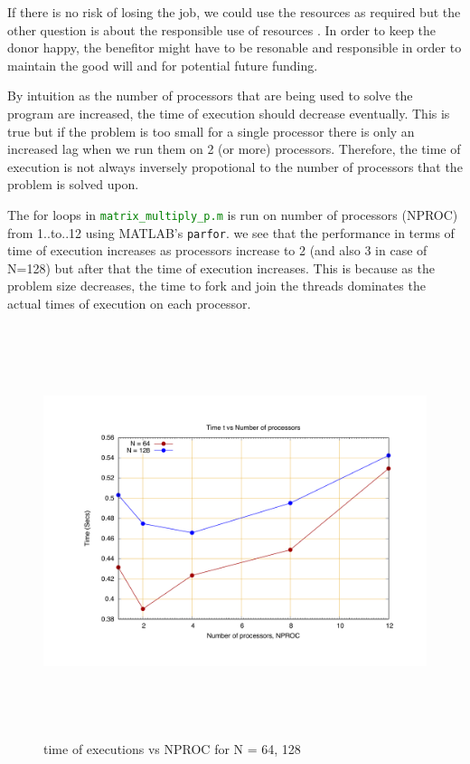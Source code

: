 \documentclass[fleqn,letterpaper,12pt]{report}
\begin{document}
If there is no risk of losing the job, we could use the resources as required but the other question is about the responsible use of resources \cite{cdresources}. In order to keep the donor happy, the benefitor might have to be resonable and responsible in order to maintain the good will and for potential future funding.

\newpage
{}
{}
\problem
By intuition as the number of processors that are being used to solve the program are increased, the time of execution should decrease eventually. This is true but if the problem is too small for a single processor there is only an increased lag when we run them on 2 (or more) processors. Therefore, the time of execution is not always inversely propotional to the number of processors that the problem is solved upon.

The for loops in {\tt\textcolor{Green}{matrix\_multiply\_p.m}} is run on number of processors (NPROC) from 1..to..12 using MATLAB's {\tt parfor}. we see that the performance in terms of time of execution increases as processors increase to 2 (and also 3 in case of N=128) but after that the time of execution increases. This is because as the problem size decreases, the time to fork and join the threads dominates the actual times of execution on each processor. 

\begin{figure}[htbp]
	\centering
	\includegraphics[height=120mm,width=160mm]{64n128.pdf}
	\caption{time of executions vs NPROC for N = 64, 128\label{overflow}}
\end{figure}
\end{document}
